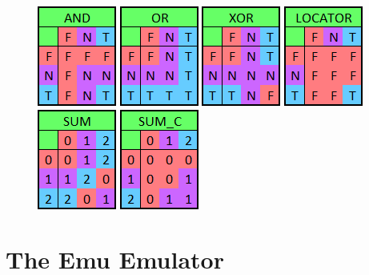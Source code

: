 \documentclass[12pt]{article}
\begin{document}
\begin{figure}[h]
\includegraphics[scale=1]{Resources/AND.PNG}
\includegraphics[scale=1]{Resources/OR.PNG}
\includegraphics[scale=1]{Resources/XOR.PNG}
\includegraphics[scale=1]{Resources/LOCATOR.PNG}
\includegraphics[scale=1]{Resources/SUM.PNG}
\includegraphics[scale=1]{Resources/SUM_C.PNG}
\end{figure}

\section{The Emu Emulator} \label{sec:Emu}
\end{document}
